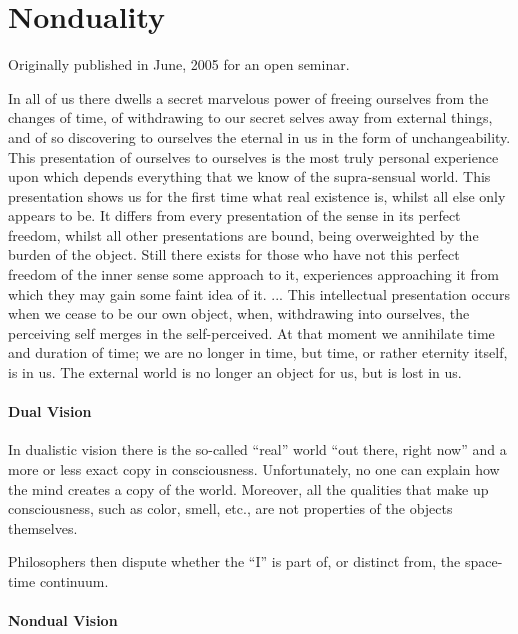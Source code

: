 \section{Nonduality}

Originally published in June, 2005 for an open seminar.

\begin{quotex}
In all of us there dwells a secret marvelous power of freeing ourselves from the changes of time, of withdrawing to our secret selves away from external things, and of so discovering to ourselves the eternal in us in the form of unchangeability. This presentation of ourselves to ourselves is the most truly personal experience upon which depends everything that we know of the supra-sensual world. This presentation shows us for the first time what real existence is, whilst all else only appears to be. It differs from every presentation of the sense in its perfect freedom, whilst all other presentations are bound, being overweighted by the burden of the object. Still there exists for those who have not this perfect freedom of the inner sense some approach to it, experiences approaching it from which they may gain some faint idea of it. ... This intellectual presentation occurs when we cease to be our own object, when, withdrawing into ourselves, the perceiving self merges in the self-perceived. At that moment we annihilate time and duration of time; we are no longer in time, but time, or rather eternity itself, is in us. The external world is no longer an object for us, but is lost in us.
\end{quotex}


\paragraph{Dual Vision}

In dualistic vision there is the so-called ``real'' world ``out there, right now'' and a more or less exact copy in consciousness. Unfortunately, no one can explain how the mind creates a copy of the world. Moreover, all the qualities that make up consciousness, such as color, smell, etc., are not properties of the objects themselves.

Philosophers then dispute whether the ``I'' is part of, or distinct from, the space-time continuum.

\paragraph{Nondual Vision}

